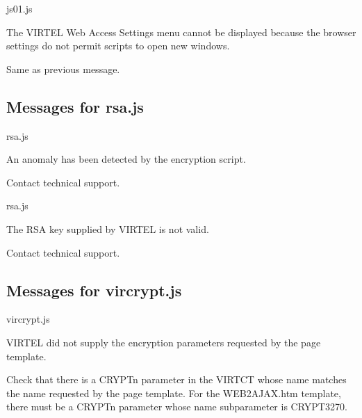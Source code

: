 \documentclass[letterpaper,10pt,english]{sphinxmanual}
\begin{document}
\sphinxAtStartPar
{}
\begin{description}
\sphinxAtStartPar
js01.js

\sphinxAtStartPar
The VIRTEL Web Access Settings menu cannot be displayed because the browser settings do not permit scripts to open new windows.

\sphinxAtStartPar
Same as previous message.

\end{description}


\subsection{Messages for rsa.js}
\label{\detokenize{messages:messages-for-rsa-js}}
\sphinxAtStartPar
{}
\begin{description}
\sphinxAtStartPar
rsa.js

\sphinxAtStartPar
An anomaly has been detected by the encryption script.

\sphinxAtStartPar
Contact technical support.

\end{description}

\sphinxAtStartPar
{}
\begin{description}
\sphinxAtStartPar
rsa.js

\sphinxAtStartPar
The RSA key supplied by VIRTEL is not valid.

\sphinxAtStartPar
Contact technical support.

\end{description}


\subsection{Messages for vircrypt.js}
\label{\detokenize{messages:messages-for-vircrypt-js}}
\sphinxAtStartPar
{}
\begin{description}
\sphinxAtStartPar
vircrypt.js

\sphinxAtStartPar
VIRTEL did not supply the encryption parameters requested by the page template.

\sphinxAtStartPar
Check that there is a CRYPTn parameter in the VIRTCT whose name matches the name requested by the page template. For the WEB2AJAX.htm template, there must be a CRYPTn parameter whose name subparameter is CRYPT3270.

\end{description}
\end{document}
